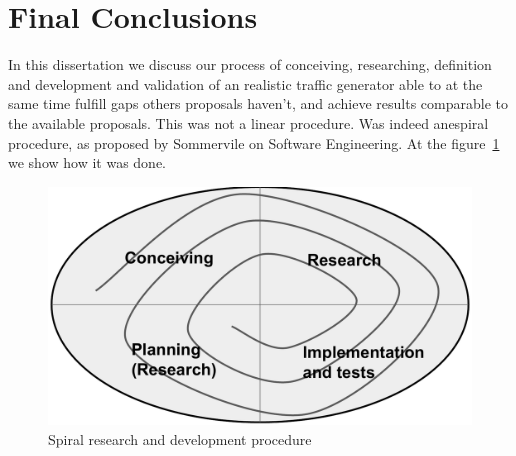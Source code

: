 



\section{Final Conclusions}


In this dissertation we discuss our process of conceiving, researching, definition and development and validation of an realistic traffic generator able to at the same time fulfill gaps others proposals haven't, and achieve results comparable to the available proposals. This was not a linear procedure. Was indeed anespiral procedure, as proposed by Sommervile on Software Engineering\cite{sommerville}. At the figure~\ref{fig:spiral} we show how it was done. 

\begin{figure}[!ht]
	\centering
	\includegraphics[scale=0.4]{figures/ch6/spiral}
	\caption{Spiral research and development procedure}
	\label{fig:spiral}
\end{figure}

